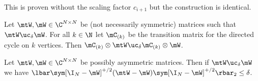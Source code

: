 This is proven without the scaling factor $c_{i+1}$ but the construction is identical.

\begin{lemma}  %
\label{app:ucCycle}
Let $\mtW, \mW \in \C^{N\times N}$ be
%
(not necessarily symmetric)  %
matrices such that $\mtW \uc_\delta \mW$. For all $k \in \N$ let $\mC_{(k)}$ be the transition matrix for the directed cycle on $k$ vertices. Then $\mC_{(k)}\otimes\mtW \uc_\delta \mC_{(k)} \otimes \mW$.
\end{lemma}
\begin{lemma} %
\label{app:ucLap}
Let $\mtW, \mW \in \C^{N\times N}$ be possibly asymmetric matrices. Then if $\mtW \uc_\delta \mW$ we have $\lbar\sym[\I_N-\mW]^{+/2}(\mtW-\mW)\sym[\I_N-\mW]^{+/2}\rbar_2\leq \delta$.
\end{lemma}

